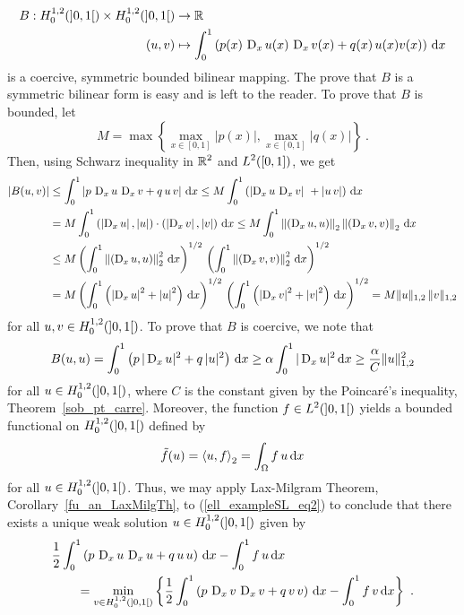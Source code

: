 \begin{egg}
\begin{align*}
B:H^{1,2}_0(]0,1[) \times H^{1,2}_0(]0,1[) &\rightarrow \mathbb{R} \\
(u,v) &\mapsto \int_0^1 \left( p(x)\,\operatorname{D}_x u(x)\,\operatorname{D}_x v(x) + q(x)\,u(x)
v(x)\right)\,\mathrm{d}{x}
\end{align*}
is a coercive, symmetric bounded bilinear mapping.  The prove that $B$
is a symmetric bilinear form is easy and is left to the reader.  To
prove that $B$ is bounded, let
\[
M = \max\left\{ \max_{x\in[0,1]} |p(x)| , \max_{x\in[0,1]} |q(x)| \right\} \ .
\]
Then, using Schwarz inequality in $\displaystyle \mathbb{R}^2$ and
$\displaystyle L^2([0,1])$, we get
\begin{align*}
|B(u,v)| &\leq \int_0^1 \left| p\, \operatorname{D}_x u\,\operatorname{D}_x v + q\,u\,v \right| \,\mathrm{d}{x}
\leq M \int_0^1 \left( \left| \operatorname{D}_x u\, \operatorname{D}_x v \right|\
+ \left|u\, v\right|\right) \,\mathrm{d}{x} \\
&= M \int_0^1 \left( \left|\operatorname{D}_x u\right|,|u| \right)
\cdot \left( \left|\operatorname{D}_x v\right|, |v| \right) \,\mathrm{d}{x}
\leq M \int_0^1 \left\| \left(\operatorname{D}_x u, u\right)\right\|_2
\left\| \left(\operatorname{D}_x v, v\right)\right\|_2 \,\mathrm{d}{x} \\
&\leq M \left( \int_0^1 \left\|\left(\operatorname{D}_x u, u\right)\right\|_2^2
\,\mathrm{d}{x} \right)^{1/2} \, \left( \int_0^1 \left\|
\left(\operatorname{D}_x v, v\right)\right\|_2^2 \,\mathrm{d}{x}\right)^{1/2} \\
&= M\left( \int_0^1 \left(\left|\operatorname{D}_x u\right|^2+ \left|u\right|^2
\right) \,\mathrm{d}{x} \right)^{1/2} \, \left( \int_0^1 \left(
\left|\operatorname{D}_x v\right|^2 + \left|v\right|^2 \right) \,\mathrm{d}{x} \right)^{1/2}
= M\| u\|_{1,2} \, \|v\|_{1,2}
\end{align*}
for all $\displaystyle u,v \in H^{1,2}_0(]0,1[)$.
To prove that $B$ is coercive, we note that
\[
B(u,u) = \int_0^1 \left( p\,|\operatorname{D}_x u|^2 + q\,|u|^2 \right)\,\mathrm{d}{x}
\geq \alpha \int_0^1 |\operatorname{D}_x u|^2 \,\mathrm{d}{x} \geq \frac{\alpha}{C}
\|u\|_{1,2}^2
\]
for all $\displaystyle u \in H^{1,2}_0(]0,1[)$,
where $C$ is the constant given by the Poincar\'e's inequality,
Theorem~\ref{sob_pt_carre}.  Moreover, the function
$\displaystyle f \in L^2(]0,1[)$ yields a bounded functional on
$\displaystyle H^{1,2}_0(]0,1[)$ defined by
\[
\tilde{f}(u) = \left\langle{u} , {f}\right\rangle_2 = \int_\Omega f\, u \,\mathrm{d}{x}
\]
for all $\displaystyle u \in H^{1,2}_0(]0,1[)$.
Thus, we may apply Lax-Milgram Theorem, Corollary~\ref{fu_an_LaxMilgTh},
to (\ref{ell_exampleSL_eq2}) to
conclude that there exists a unique weak solution
$\displaystyle u \in H^{1,2}_0(]0,1[)$ given by
\begin{align*}
&\frac{1}{2} \int_0^1 \left( p\,\operatorname{D}_x u\, \operatorname{D}_x u + q\,u\,u \right) \,\mathrm{d}{x}
-\int_0^1 f\, u \,\mathrm{d}{x} \\
& \qquad = \min_{v\in H^{1,2}_0(]0,1[)} \left\{ \frac{1}{2}
\int_0^1 \left( p\,\operatorname{D}_x v\,\operatorname{D}_x v + q\,v\,v \right) \,\mathrm{d}{x}
-\int_0^1 f \, v \,\mathrm{d}{x} \right\} \ .
\end{align*}


\end{egg}
